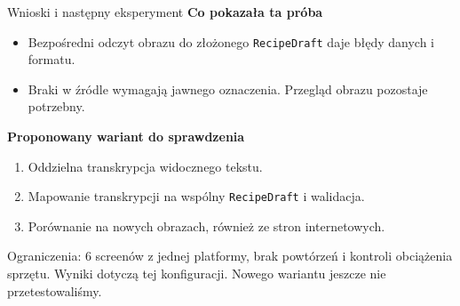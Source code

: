 \documentclass[aspectratio=169,11pt]{beamer}
\begin{document}
\begin{frame}{Wnioski i następny eksperyment}
  \textbf{Co pokazała ta próba}
  \begin{itemize}
    \setlength{\itemsep}{0.1cm}
    \item Bezpośredni odczyt obrazu do złożonego \texttt{RecipeDraft} daje błędy danych i formatu.
    \item Braki w źródle wymagają jawnego oznaczenia. Przegląd obrazu pozostaje potrzebny.
  \end{itemize}

  \vspace{0.1cm}
  \textbf{Proponowany wariant do sprawdzenia}
  \begin{enumerate}
    \setlength{\itemsep}{0.08cm}
    \item Oddzielna transkrypcja widocznego tekstu.
    \item Mapowanie transkrypcji na wspólny \texttt{RecipeDraft} i walidacja.
    \item Porównanie na nowych obrazach, również ze stron internetowych.
  \end{enumerate}

  \vspace{0.1cm}
  {\small\color{Muted}Ograniczenia: 6 screenów z jednej platformy, brak powtórzeń i kontroli obciążenia sprzętu. Wyniki dotyczą tej konfiguracji. Nowego wariantu jeszcze nie przetestowaliśmy.}
\end{frame}
\end{document}
